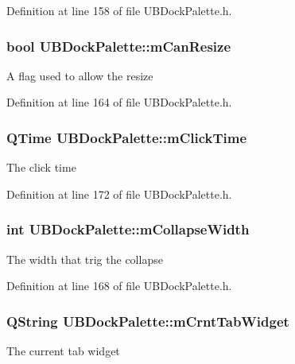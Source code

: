 Definition at line 158 of file U\-B\-Dock\-Palette.\-h.

\hypertarget{class_u_b_dock_palette_a260643aac69a6ecff7b344bafd9cfffe}{
\subsubsection[{m\-Can\-Resize}]{\setlength{\rightskip}{0pt plus 5cm}bool U\-B\-Dock\-Palette\-::m\-Can\-Resize\hspace{0.3cm}{\ttfamily [protected]}}}\label{dc/d54/class_u_b_dock_palette_a260643aac69a6ecff7b344bafd9cfffe}
A flag used to allow the resize 

Definition at line 164 of file U\-B\-Dock\-Palette.\-h.

\hypertarget{class_u_b_dock_palette_a70b3694376d28f25de47e1d1c5c0c958}{
\subsubsection[{m\-Click\-Time}]{\setlength{\rightskip}{0pt plus 5cm}Q\-Time U\-B\-Dock\-Palette\-::m\-Click\-Time\hspace{0.3cm}{\ttfamily [protected]}}}\label{dc/d54/class_u_b_dock_palette_a70b3694376d28f25de47e1d1c5c0c958}
The click time 

Definition at line 172 of file U\-B\-Dock\-Palette.\-h.

\hypertarget{class_u_b_dock_palette_a0b425ad7936ee42a5dcf117b4327bde4}{
\subsubsection[{m\-Collapse\-Width}]{\setlength{\rightskip}{0pt plus 5cm}int U\-B\-Dock\-Palette\-::m\-Collapse\-Width\hspace{0.3cm}{\ttfamily [protected]}}}\label{dc/d54/class_u_b_dock_palette_a0b425ad7936ee42a5dcf117b4327bde4}
The width that trig the collapse 

Definition at line 168 of file U\-B\-Dock\-Palette.\-h.

\hypertarget{class_u_b_dock_palette_afc7da58d611bcb1004dc52fec6d38dcb}{
\subsubsection[{m\-Crnt\-Tab\-Widget}]{\setlength{\rightskip}{0pt plus 5cm}Q\-String U\-B\-Dock\-Palette\-::m\-Crnt\-Tab\-Widget\hspace{0.3cm}{\ttfamily [protected]}}}\label{dc/d54/class_u_b_dock_palette_afc7da58d611bcb1004dc52fec6d38dcb}
The current tab widget 

